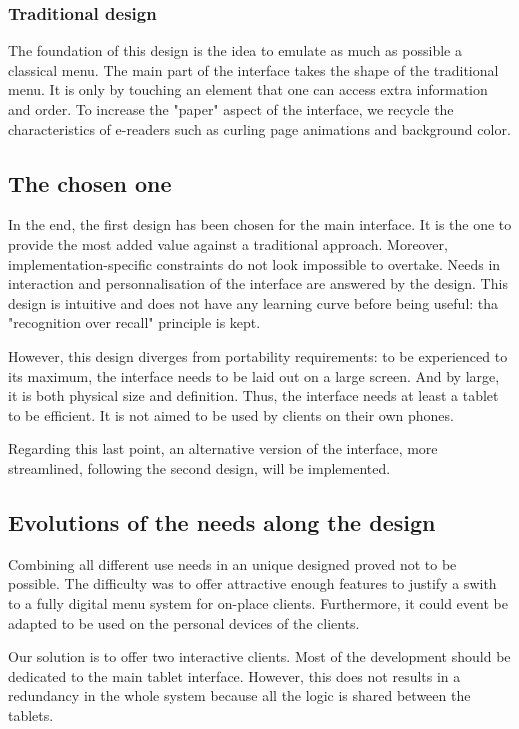 \documentclass[a4paper,12pt]{article}
\begin{document}
\subsubsection{Traditional design}

The foundation of this design is the idea to emulate as much as possible a classical menu. The main part of the
interface takes the shape of the traditional menu. It is only by touching an element that one can access extra
information and order. To increase the "paper" aspect of the interface, we recycle the characteristics of
e-readers such as curling page animations and background color.

\subsection{The chosen one}

In the end, the first design has been chosen for the main interface. It is the one to provide the most added value
against a traditional approach. Moreover, implementation-specific constraints do not look impossible to overtake.
Needs in interaction and personnalisation of the interface are answered by the design. This design is intuitive and
does not have any learning curve before being useful: tha "recognition over recall" principle is kept.

However, this design diverges from portability requirements: to be experienced to its maximum, the interface needs to
be laid out on a large screen. And by large, it is both physical size and definition. Thus, the interface needs at
least a tablet to be efficient. It is not aimed to be used by clients on their own phones.

Regarding this last point, an alternative version of the interface, more streamlined, following the second design,
will be implemented.

\subsection{Evolutions of the needs along the design}

Combining all different use needs in an unique designed proved not to be possible. The difficulty was to offer
attractive enough features to justify a swith to a fully digital menu system for on-place clients. Furthermore, it
could event be adapted to be used on the personal devices of the clients.

Our solution is to offer two interactive clients. Most of the development should be dedicated to the main tablet
interface. However, this does not results in a redundancy in the whole system because all the logic is shared between
the tablets.
\end{document}

